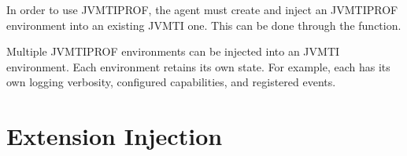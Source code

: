 \label{chap:api}

In order to use JVMTIPROF, the agent must create and inject an JVMTIPROF environment into an existing JVMTI one. This can be done through the \hyperref[api:jvmtiProf_Create]{} function.

Multiple JVMTIPROF environments can be injected into an JVMTI environment. Each environment retains its own state. For example, each has its own logging verbosity, configured capabilities, and registered events.





\section{Extension Injection}

